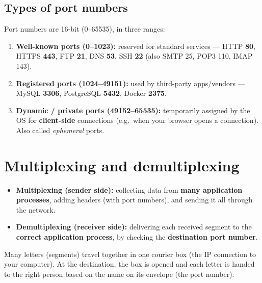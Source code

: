 \subsection{Types of port numbers}
Port numbers are 16-bit (0--65535), in three ranges:
\begin{center}
\end{center}
\begin{enumerate}
  \item \textbf{Well-known ports (0--1023):} reserved for standard services --- HTTP \textbf{80}, HTTPS \textbf{443}, FTP \textbf{21}, DNS \textbf{53}, SSH \textbf{22} (also SMTP 25, POP3 110, IMAP 143).
  \item \textbf{Registered ports (1024--49151):} used by third-party apps/vendors --- MySQL \textbf{3306}, PostgreSQL \textbf{5432}, Docker \textbf{2375}.
  \item \textbf{Dynamic / private ports (49152--65535):} temporarily assigned by the OS for \textbf{client-side} connections (e.g.\ when your browser opens a connection). Also called \emph{ephemeral} ports.
\end{enumerate}

\section{Multiplexing and demultiplexing}
\begin{itemize}
  \item \textbf{Multiplexing (sender side):} collecting data from \textbf{many application processes}, adding headers (with port numbers), and sending it all through the network.
  \item \textbf{Demultiplexing (receiver side):} delivering each received segment to the \textbf{correct application process}, by checking the \textbf{destination port number}.
\end{itemize}
\begin{analogy}
Many letters (segments) travel together in one courier box (the IP connection to your computer). At the destination, the box is opened and each letter is handed to the right person based on the name on its envelope (the port number).
\end{analogy}

